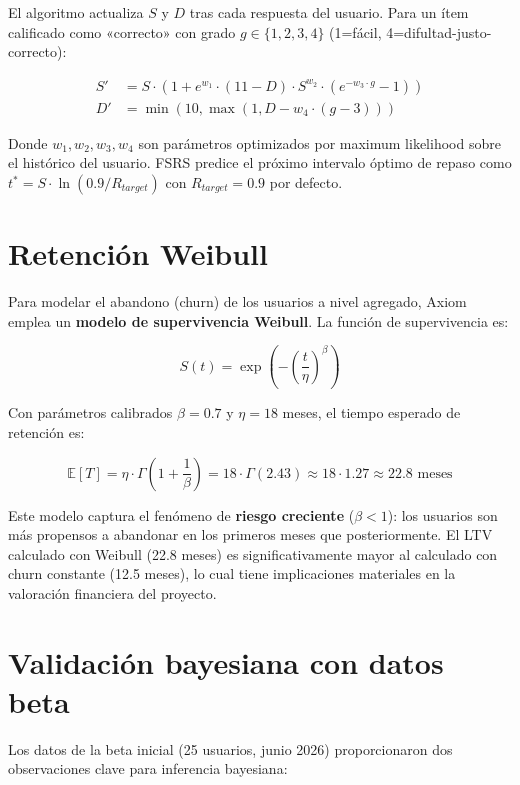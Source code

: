 \documentclass[10pt,a4paper,oneside]{report}
\begin{document}
El algoritmo actualiza $S$ y $D$ tras cada respuesta del usuario. Para un ítem calificado como «correcto» con grado $g \in \{1, 2, 3, 4\}$ (1=fácil, 4=difultad-justo-correcto):

\begin{align}
S' &= S \cdot \left(1 + e^{w_1} \cdot (11 - D) \cdot S^{w_2} \cdot \left(e^{-w_3 \cdot g} - 1\right)\right) \\
D' &= \min(10, \max(1, D - w_4 \cdot (g - 3)))
\end{align}

Donde $w_1, w_2, w_3, w_4$ son parámetros optimizados por maximum likelihood sobre el histórico del usuario. FSRS predice el próximo intervalo óptimo de repaso como $t^* = S \cdot \ln(0.9 / R_{target})$ con $R_{target} = 0.9$ por defecto.

\section{Retención Weibull}
Para modelar el abandono (churn) de los usuarios a nivel agregado, Axiom emplea un \textbf{modelo de supervivencia Weibull}. La función de supervivencia es:

\begin{equation}
S(t) = \exp\left(-\left(\frac{t}{\eta}\right)^\beta\right)
\end{equation}

Con parámetros calibrados $\beta = 0.7$ y $\eta = 18$ meses, el tiempo esperado de retención es:

\begin{equation}
\mathbb{E}[T] = \eta \cdot \Gamma\left(1 + \frac{1}{\beta}\right) = 18 \cdot \Gamma(2.43) \approx 18 \cdot 1.27 \approx 22.8 \text{ meses}
\end{equation}

Este modelo captura el fenómeno de \textbf{riesgo creciente} ($\beta < 1$): los usuarios son más propensos a abandonar en los primeros meses que posteriormente. El LTV calculado con Weibull (22.8 meses) es significativamente mayor al calculado con churn constante (12.5 meses), lo cual tiene implicaciones materiales en la valoración financiera del proyecto.

\section{Validación bayesiana con datos beta}
Los datos de la beta inicial (25 usuarios, junio 2026) proporcionaron dos observaciones clave para inferencia bayesiana:
\end{document}
